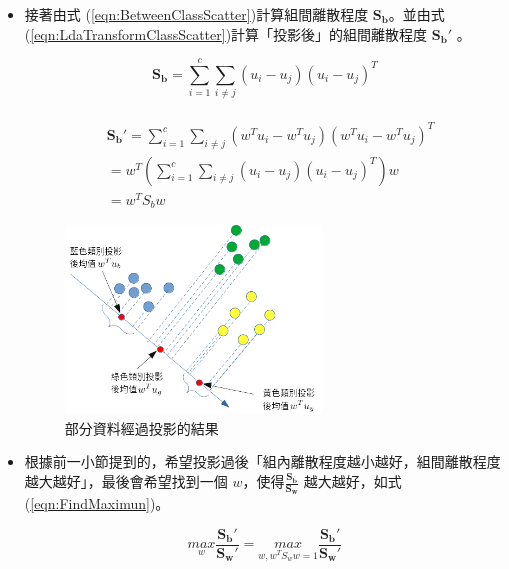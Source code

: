 \begin{itemize}
	\item
		接著由式 (\ref{eqn:BetweenClassScatter})計算組間離散程度 \(\mathbf{S_b}\)。並由式 (\ref{eqn:LdaTransformClassScatter})計算「投影後」的組間離散程度 \(\mathbf{{S_b}'}\) 。

	      \begin{equation}
		      \label{eqn:BetweenClassScatter}
		      \mathbf{S_b} =\sum_{i=1}^{c}\sum_{i \neq j } (u_i - u_j)(u_i - u_j)^T
	      \end{equation}

	      \begin{equation}
		      \label{eqn:LdaTransformClassScatter}
		      \begin{aligned}
			      \\&\mathbf{{S_b}'} =\sum_{i=1}^{c}\sum_{i \neq j } (w^Tu_i - w^Tu_j)(w^Tu_i - w^Tu_j)^T
			      \\& =w^T(\sum_{i=1}^{c}\sum_{i \neq j } (u_i - u_j)(u_i - u_j)^T)w
			      \\& =w^TS_bw
		      \end{aligned}
	      \end{equation}



	      \begin{figure}[H]
		      \centering
		      \includegraphics[height=5cm]{./pic/0JcYc52J.png}
		      \caption{部分資料經過投影的結果}
		      \label{fig:LdaTransform}
	      \end{figure}

	\item
	      根據前一小節提到的，希望投影過後「組內離散程度越小越好，組間離散程度越大越好」，最後會希望找到一個 \(w\)，使得\(\frac{\mathbf{S_b}}{\mathbf{S_w}}\) 越大越好，如式(\ref{eqn:FindMaximun})。

	      \begin{equation}
		      \label{eqn:FindMaximun}
		      \underset{w}{max}\frac{\mathbf{{S_b}'}}{\mathbf{{S_w}'}} =\underset{w,w^TS_ww = 1}{max}\frac{\mathbf{{S_b}'}}{\mathbf{{S_w}'}}
	      \end{equation}



\end{itemize}
